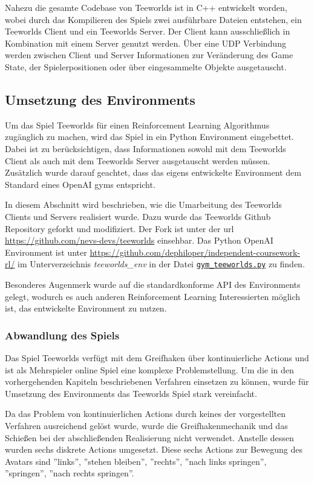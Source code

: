 \documentclass[11pt]{scrartcl}
\begin{document}
Nahezu die gesamte Codebase von Teeworlds ist in C++ entwickelt worden, wobei durch das Kompilieren
des Spiels zwei ausführbare Dateien entstehen, ein Teeworlds Client und ein Teeworlds Server. Der
Client kann ausschließlich in Kombination mit einem Server genutzt werden. Über eine UDP Verbindung
werden zwischen Client und Server Informationen zur Veränderung des Game State, der Spielerpositionen
oder über eingesammelte Objekte ausgetauscht.

\subsection{Umsetzung des Environments}
Um das Spiel Teeworlds für einen Reinforcement Learning Algorithmus zugänglich zu machen,
wird das Spiel in ein Python Environment eingebettet. Dabei ist zu be\-rück\-sich\-ti\-gen, dass
Informationen sowohl mit dem Teeworlds Client als auch mit dem Teeworlds Server ausgetauscht
werden müssen. Zusätzlich wurde darauf geachtet, dass das eigens entwickelte Environment dem
Standard eines OpenAI gyms entspricht.

In diesem Abschnitt wird beschrieben, wie die Umarbeitung des Teeworlds Clients und
Servers realisiert wurde. Dazu wurde das Teeworlds Github Repository geforkt und
modifiziert. Der Fork ist unter der url \url{https://github.com/nevs-devs/teeworlds} einsehbar.
Das Python OpenAI Environment ist unter \url{https://github.com/dephiloper/independent-coursework-rl/}
im Unterverzeichnis \textit{teeworlds\_env} in der Datei
\href{https://github.com/dephiloper/independent-coursework-rl/blob/master/teeworlds_env/gym_teeworlds.py}
{\nolinkurl{gym\_teeworlds.py}} zu finden.

Besonderes Augenmerk wurde auf die standardkonforme API des Environments gelegt, wodurch
es auch anderen Reinforcement Learning Interessierten möglich ist, das entwickelte
Environment zu nutzen.

\subsubsection{Abwandlung des Spiels}
Das Spiel Teeworlds verfügt mit dem Greifhaken über kontinuierliche Actions und ist als
Mehrspieler online Spiel eine komplexe Problemstellung. Um die in den vorhergehenden
Kapiteln beschriebenen Verfahren einsetzen zu können, wurde für Umsetzung des Environments
das Teeworlds Spiel stark vereinfacht.

Da das Problem von kontinuierlichen Actions durch keines der vorgestellten Verfahren
ausreichend gelöst wurde, wurde die Greifhakenmechanik und das Schießen bei der
abschließenden Realisierung nicht verwendet. Anstelle dessen wurden sechs diskrete
Actions umgesetzt. Diese sechs Actions zur Bewegung des Avatars sind ''links'',
''stehen bleiben'', ''rechts'', ''nach links springen'', ''springen'',
''nach rechts springen''.
\end{document}
